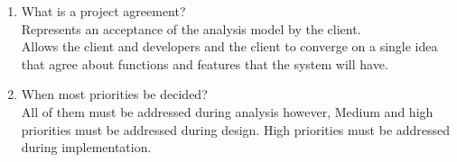 \documentclass[10pt]{article}
\begin{document}
\begin{enumerate}
      \item What is a project agreement?\\
            Represents an acceptance of the analysis model by the client.\\
            Allows the client and developers and the client to converge on a single idea that agree about functions and features that the system will have.\\

      \item When most priorities be decided?\\
            All of them must be addressed during analysis however,
            Medium and high priorities must be addressed during design.
            High priorities must be addressed during implementation.\\
\end{enumerate}
\end{document}
